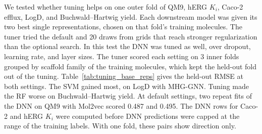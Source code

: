 \label{app:add:tuning_base_reps}
We tested whether tuning helps on one outer fold of QM9, hERG $K_i$, Caco-2 efflux, LogD, and Buchwald--Hartwig yield. Each downstream model was given its two best single representations, chosen on that fold's training molecules. The tuner tried the default and 20 draws from grids that reach stronger regularization than the optional search. In this test the DNN was tuned as well, over dropout, learning rate, and layer sizes. The tuner scored each setting on 3 inner folds grouped by scaffold family of the training molecules, which kept the held-out fold out of the tuning. Table~\ref{tab:tuning_base_reps} gives the held-out RMSE at both settings. The SVM gained most, on LogD with MHG-GNN. Tuning made the RF worse on Buchwald--Hartwig yield. At default settings, two repeat fits of the DNN on QM9 with Mol2vec scored 0.487 and 0.495. The DNN rows for Caco-2 and hERG $K_i$ were computed before DNN predictions were capped at the range of the training labels. With one fold, these pairs show direction only.
